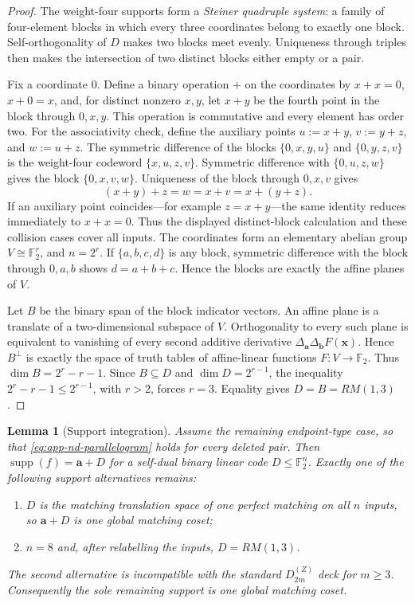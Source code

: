 \documentclass[11pt,letterpaper,onecolumn]{article}
\theoremstyle{plain}
\newtheorem{lemma}[lemma]{Lemma}
\theoremstyle{definition}
\theoremstyle{remark}
\newcommand{\Ftwo}{\mathbb F_2}
\newcommand{\DihZ}[1]{{D_{#1}^{(Z)}}}
\newcommand{\supp}{\operatorname{supp}}
\begin{document}
\begin{proof}
The weight-four supports form a \emph{Steiner quadruple system}: a family of
four-element blocks in which every three coordinates belong to exactly one
block.  Self-orthogonality
of \(D\) makes two blocks meet evenly. Uniqueness through triples then makes
the intersection of two distinct blocks either empty or a pair.

Fix a coordinate \(0\).  Define a binary operation \(+\) on the coordinates
by \(x+x=0\), \(x+0=x\), and, for distinct nonzero \(x,y\), let \(x+y\) be
the fourth point in the block through
\(0,x,y\).  This operation is commutative and every element has order two.
For the associativity check, define the auxiliary points \(u:=x+y\),
\(v:=y+z\), and \(w:=u+z\).  The symmetric
difference of the blocks \(\{0,x,y,u\}\) and \(\{0,y,z,v\}\) is the
weight-four codeword \(\{x,u,z,v\}\).  Symmetric difference with
\(\{0,u,z,w\}\) gives the block \(\{0,x,v,w\}\).  Uniqueness of the
block through \(0,x,v\) gives
\[
 (x+y)+z=w=x+v=x+(y+z).
\]
If an auxiliary point coincides---for example \(z=x+y\)---the same identity
reduces immediately to \(x+x=0\). Thus the displayed distinct-block
calculation and these collision cases cover all inputs.  The coordinates form an
elementary abelian group \(V\cong\Ftwo^r\), and \(n=2^r\).  If
\(\{a,b,c,d\}\) is any block, symmetric difference with the block through
\(0,a,b\) shows \(d=a+b+c\). Hence the blocks are exactly the affine
planes of \(V\).

Let \(B\) be the binary span of the block indicator vectors.  An affine plane is a translate of a two-dimensional
subspace of \(V\).  Orthogonality to every such plane is equivalent to
vanishing of every second additive derivative
\(\Delta_{\mathbf{a}}\Delta_{\mathbf{b}}F({\mathbf{x}})\). Hence \(B^\perp\) is exactly the space of truth
tables of affine-linear functions \(F:V\to\Ftwo\).  Thus
\(\dim B=2^r-r-1\).  Since \(B\subseteq D\) and
\(\dim D=2^{r-1}\), the inequality \(2^r-r-1\le2^{r-1}\), with \(r>2\),
forces \(r=3\). Equality gives \(D=B=RM(1,3)\).
\end{proof}

\begin{lemma}[Support integration]
\label{lem:app-nd-support-integration}
Assume the remaining endpoint-type case, so that
\cref{eq:app-nd-parallelogram} holds for every deleted pair.  Then
\(\supp(f)={\mathbf{a}}+D\) for a self-dual binary linear code \(D\le\Ftwo^n\).
Exactly one of the following support alternatives remains:
\begin{enumerate}
\item \(D\) is the matching translation space of one perfect matching on
      all \(n\) inputs, so \({\mathbf{a}}+D\) is one \emph{global matching coset};
\item \(n=8\) and, after relabelling the inputs, \(D=RM(1,3)\).
\end{enumerate}
The second alternative is incompatible with the standard \(\DihZ{2m}\) deck for \(m\ge3\).  Consequently the sole
remaining support is one global matching coset.
\end{lemma}
\end{document}
